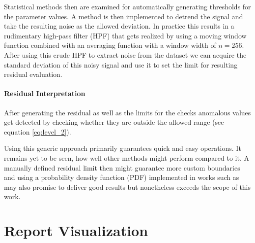 Statistical methods then are examined for automatically generating thresholds for the parameter values. A method is then implemented to detrend the signal and take the resulting noise as the allowed deviation. In practice this results in a rudimentary high-pass filter (HPF) that gets realized by using a moving window function combined with an averaging function with a window width of $n=256$. After using this crude HPF to extract noise from the dataset we can acquire the standard deviation of this noisy signal and use it to set the limit for resulting residual evaluation.


\paragraph{Residual Interpretation}

After generating the residual as well as the limits for the checks anomalous values get detected by checking whether they are outside the allowed range (see equation \ref{eq:level_2}).

Using this generic approach primarily guarantees quick and easy operations. It remains yet to be seen, how well other methods might perform compared to it. A manually defined residual limit then might guarantee more custom boundaries and using a probability density function (PDF) implemented in works such as \cite{svard_data-driven_2014} may also promise to deliver good results but nonetheless exceeds the scope of this work.



\newpage


\section{Report Visualization}
\label{chap:4-visualization}

